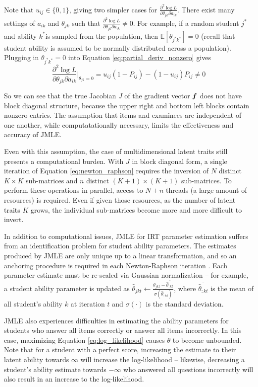 Note that $u_{ij} \in \{0,1\}$, giving two simpler cases for $\frac{\partial^2 \log L}{\partial \theta_{jk} \partial a_{ik}}$. There exist many settings of $a_{ik}$ and $\theta_{jk}$ such that  $\frac{\partial^2 \log L}{\partial \theta_{jk} \partial a_{ik}} \not = 0$. For example, if a random student $j^*$ and ability $k^*$is sampled from the population, then $\mathbb{E}[\theta_{j^*k^*}] = 0$ (recall that student ability is assumed to be normally distributed across a population). Plugging in $\theta_{j^*k^*} = 0$ into Equation \ref{eq:partial_deriv_nonzero} gives
\[\frac{\partial^2 \log L}{\partial \theta_{jk} \partial a_{ik}}\Big|_{\theta_{jk}=0} = u_{ij}(1-P_{ij}) - (1-u_{ij})P_{ij} \not= 0 \]

So we can see that the true Jacobian $J$ of the gradient vector $\boldsymbol{f}$ does not have block diagonal structure, because the upper right and bottom left blocks contain nonzero entries. The assumption that items and examinees are independent of one another, while computatationally necessary, limits the effectiveness and accuracy of JMLE. 

Even with this assumption, the case of multidimensional latent traits still presents a computational burden. With $J$ in block diagonal form, a single iteration of Equation \ref{eq:newton_raphson} requires the inversion of $N$ distinct $K\times K$ sub-matrices and $n$ distinct $(K+1) \times (K+1)$ sub-matrices. To perform these operations in parallel, access to $N + n$ threads (a large amount of resources) is required. Even if given those resources, as the number of latent traits $K$ grows, the individual sub-matrices become more and more difficult to invert.

In addition to computational issues, JMLE for IRT parameter estimation suffers from an identification problem for student ability parameters. The estimates produced by JMLE are only unique up to a linear transformation, and so an anchoring procedure is required in each Newton-Raphson iteration \cite{baker_kim2004}. Each parameter estimate must be re-scaled via Gaussian normalization -- for example, a student ability parameter is updated as $\hat \theta_{jkt} \gets \frac{\theta_{jkt} - \overline{\hat \theta_{:kt}}}{\sigma(\hat \theta_{:kt})}$, where $\overline{\hat \theta_{:kt}}$ is the mean of all student's ability $k$ at iteration $t$ and  $\sigma(\cdot)$ is the standard deviation.

JMLE also experiences difficulties in estimating the ability parameters for students who answer all items correctly or answer all items incorrectly. In this case, maximizing Equation \ref{eq:log_likelihood} causes $\theta$ to become unbounded. Note that for a student with a perfect score, increasing the estimate to their latent ability towards $\infty$ will increase the log-likelihood -- likewise, decreasing a student's ability estimate towards $-\infty$ who answered all questions incorrectly will also result in an increase to the log-likelihood.

